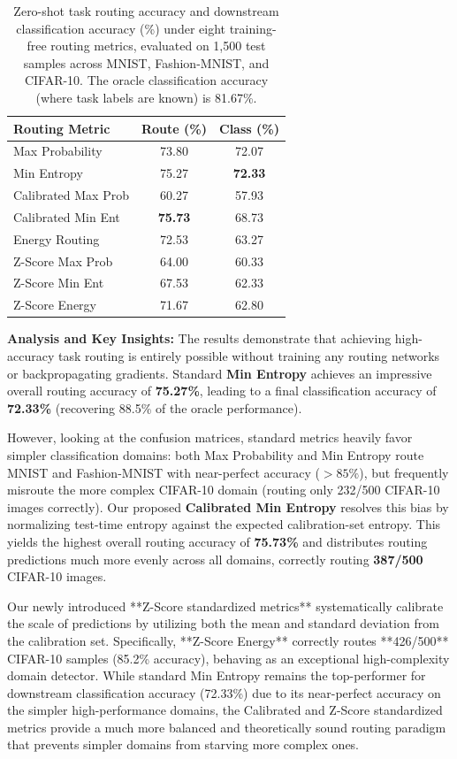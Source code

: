 \documentclass{article}
\theoremstyle{plain}
\theoremstyle{definition}
\theoremstyle{remark}
\begin{document}
\begin{table}[h]
\centering
\caption{Zero-shot task routing accuracy and downstream classification accuracy (\%) under eight training-free routing metrics, evaluated on 1,500 test samples across MNIST, Fashion-MNIST, and CIFAR-10. The oracle classification accuracy (where task labels are known) is 81.67\%.}
\label{tab:routing_results}
\vskip 0.1in
\begin{tabular}{lcc}
\toprule
\textbf{Routing Metric} & \textbf{Route (\%)} & \textbf{Class (\%)} \\
\midrule
Max Probability & 73.80 & 72.07 \\
Min Entropy & 75.27 & \textbf{72.33} \\
Calibrated Max Prob & 60.27 & 57.93 \\
Calibrated Min Ent & \textbf{75.73} & 68.73 \\
Energy Routing & 72.53 & 63.27 \\
\midrule
Z-Score Max Prob & 64.00 & 60.33 \\
Z-Score Min Ent & 67.53 & 62.33 \\
Z-Score Energy & 71.67 & 62.80 \\
\bottomrule
\end{tabular}
\end{table}

\textbf{Analysis and Key Insights:}
The results demonstrate that achieving high-accuracy task routing is entirely possible without training any routing networks or backpropagating gradients. Standard \textbf{Min Entropy} achieves an impressive overall routing accuracy of \textbf{75.27\%}, leading to a final classification accuracy of \textbf{72.33\%} (recovering 88.5\% of the oracle performance). 

However, looking at the confusion matrices, standard metrics heavily favor simpler classification domains: both Max Probability and Min Entropy route MNIST and Fashion-MNIST with near-perfect accuracy ($>85\%$), but frequently misroute the more complex CIFAR-10 domain (routing only 232/500 CIFAR-10 images correctly). 
Our proposed \textbf{Calibrated Min Entropy} resolves this bias by normalizing test-time entropy against the expected calibration-set entropy. This yields the highest overall routing accuracy of \textbf{75.73\%} and distributes routing predictions much more evenly across all domains, correctly routing \textbf{387/500} CIFAR-10 images. 

Our newly introduced **Z-Score standardized metrics** systematically calibrate the scale of predictions by utilizing both the mean and standard deviation from the calibration set. Specifically, **Z-Score Energy** correctly routes **426/500** CIFAR-10 samples (85.2\% accuracy), behaving as an exceptional high-complexity domain detector. While standard Min Entropy remains the top-performer for downstream classification accuracy (72.33\%) due to its near-perfect accuracy on the simpler high-performance domains, the Calibrated and Z-Score standardized metrics provide a much more balanced and theoretically sound routing paradigm that prevents simpler domains from starving more complex ones.
\end{document}
